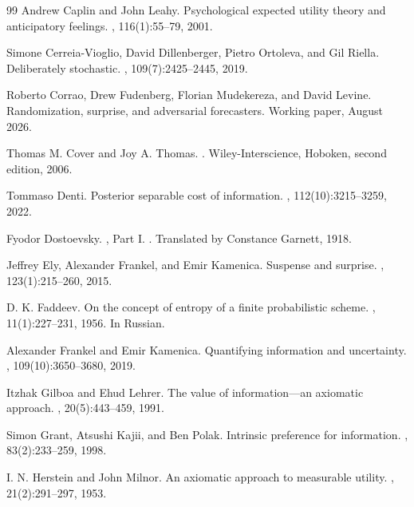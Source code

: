 \documentclass[11pt,a4paper]{article}
\theoremstyle{definition}
\newcommand{\1}{\mathbf 1}
\begin{document}
\begin{thebibliography}{99}
Andrew Caplin and John Leahy.
\newblock Psychological expected utility theory and anticipatory feelings.
, 116(1):55--79, 2001.

Simone Cerreia-Vioglio, David Dillenberger, Pietro Ortoleva, and Gil Riella.
\newblock Deliberately stochastic.
, 109(7):2425--2445, 2019.

Roberto Corrao, Drew Fudenberg, Florian Mudekereza, and David Levine.
\newblock Randomization, surprise, and adversarial forecasters.
\newblock Working paper, August 2026.

Thomas M. Cover and Joy A. Thomas.
.
\newblock Wiley-Interscience, Hoboken, second edition, 2006.

Tommaso Denti.
\newblock Posterior separable cost of information.
, 112(10):3215--3259, 2022.

Fyodor Dostoevsky.
, Part I.
.  Translated by Constance Garnett, 1918.

Jeffrey Ely, Alexander Frankel, and Emir Kamenica.
\newblock Suspense and surprise.
, 123(1):215--260, 2015.

D. K. Faddeev.
\newblock On the concept of entropy of a finite probabilistic scheme.
, 11(1):227--231, 1956.
\newblock In Russian.

Alexander Frankel and Emir Kamenica.
\newblock Quantifying information and uncertainty.
, 109(10):3650--3680, 2019.

Itzhak Gilboa and Ehud Lehrer.
\newblock The value of information---an axiomatic approach.
, 20(5):443--459, 1991.

Simon Grant, Atsushi Kajii, and Ben Polak.
\newblock Intrinsic preference for information.
, 83(2):233--259, 1998.

I. N. Herstein and John Milnor.
\newblock An axiomatic approach to measurable utility.
, 21(2):291--297, 1953.


\end{thebibliography}
\end{document}

